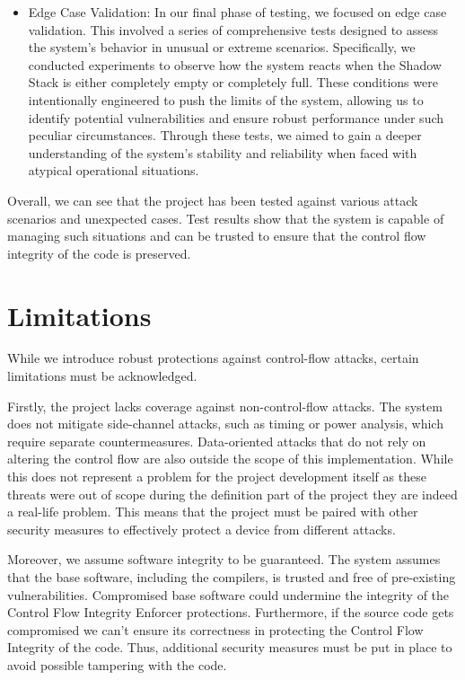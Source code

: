 \begin{itemize}
  \item Edge Case Validation: In our final phase of testing, we focused on edge case
    validation. This involved a series of comprehensive tests designed to assess
    the system's behavior in unusual or extreme scenarios. Specifically, we
    conducted experiments to observe how the system reacts when the Shadow Stack
    is either completely empty or completely full. These conditions were intentionally
    engineered to push the limits of the system, allowing us to identify
    potential vulnerabilities and ensure robust performance under such peculiar
    circumstances. Through these tests, we aimed to gain a deeper understanding
    of the system's stability and reliability when faced with atypical
    operational situations.
\end{itemize}

Overall, we can see that the project has been tested against various attack scenarios
and unexpected cases. Test results show that the system is capable of managing
such situations and can be trusted to ensure that the control flow integrity of
the code is preserved.

\section{Limitations}
\label{sec:ta_limitations}

While we introduce robust protections against control-flow attacks, certain
limitations must be acknowledged.

Firstly, the project lacks coverage against non-control-flow attacks. The system
does not mitigate side-channel attacks, such as timing or power analysis, which
require separate countermeasures. Data-oriented attacks that do not rely on altering
the control flow are also outside the scope of this implementation. While this
does not represent a problem for the project development itself as these threats
were out of scope during the definition part of the project they are indeed a
real-life problem. This means that the project must be paired with other security
measures to effectively protect a device from different attacks.

Moreover, we assume software integrity to be guaranteed. The system assumes that
the base software, including the compilers, is trusted and free of pre-existing vulnerabilities.
Compromised base software could undermine the integrity of the Control Flow
Integrity Enforcer protections. Furthermore, if the source code gets compromised
we can't ensure its correctness in protecting the Control Flow Integrity of the
code. Thus, additional security measures must be put in place to avoid possible
tampering with the code.

